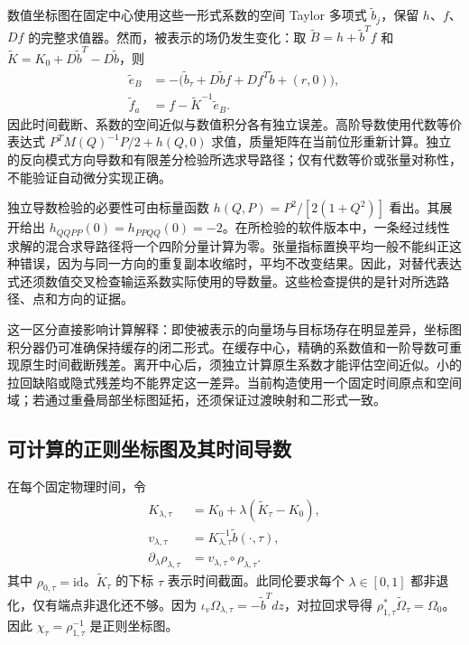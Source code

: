 数值坐标图在固定中心使用这些一形式系数的空间 Taylor 多项式 $\widetilde b_j$，保留 $h$、$f$、$Df$ 的完整求值器。然而，被表示的场仍发生变化：取 $\widetilde B=h+\widetilde b^Tf$ 和 $\widetilde K=K_0+D\widetilde b^T-D\widetilde b$，则
\begin{equation}
 \begin{aligned}
 \widetilde e_B&=-\bigl(\widetilde b_\tau+D\widetilde b f
                         +Df^T\widetilde b+(r,0)\bigr),\\
 \widetilde f_a&=f-\widetilde K^{-1}\widetilde e_B .
\end{aligned}
 \label{eq:th-cache-residual}
\end{equation}
因此时间截断、系数的空间近似与数值积分各有独立误差。高阶导数使用代数等价表达式 $P^TM(Q)^{-1}P/2+h(Q,0)$ 求值，质量矩阵在当前位形重新计算。独立的反向模式方向导数和有限差分检验所选求导路径；仅有代数等价或张量对称性，不能验证自动微分实现正确。

独立导数检验的必要性可由标量函数 $h(Q,P)=P^2/[2(1+Q^2)]$ 看出。其展开给出 $h_{QQPP}(0)=h_{PPQQ}(0)=-2$。在所检验的软件版本中，一条经过线性求解的混合求导路径将一个四阶分量计算为零。张量指标置换平均一般不能纠正这种错误，因为与同一方向的重复副本收缩时，平均不改变结果。因此，对替代表达式还须数值交叉检查输运系数实际使用的导数量。这些检查提供的是针对所选路径、点和方向的证据。

这一区分直接影响计算解释：即使被表示的向量场与目标场存在明显差异，坐标图积分器仍可准确保持缓存的闭二形式。在缓存中心，精确的系数值和一阶导数可重现原生时间截断残差。离开中心后，须独立计算原生系数才能评估空间近似。小的拉回缺陷或隐式残差均不能界定这一差异。当前构造使用一个固定时间原点和空间域；若通过重叠局部坐标图延拓，还须保证过渡映射和二形式一致。

\subsection{可计算的正则坐标图及其时间导数}
在每个固定物理时间，令
\begin{equation}
 \begin{aligned}
 K_{\lambda,\tau}&=K_0+\lambda(\widetilde K_\tau-K_0),\\
 v_{\lambda,\tau}&=K_{\lambda,\tau}^{-1}\widetilde b(\cdot,\tau),\\
 \partial_\lambda\rho_{\lambda,\tau}
     &=v_{\lambda,\tau}\circ\rho_{\lambda,\tau}.
\end{aligned}
 \label{eq:th-moser}
\end{equation}
其中 $\rho_{0,\tau}=\mathrm{id}$。$\widetilde K_\tau$ 的下标 $\tau$ 表示时间截面。此同伦要求每个 $\lambda\in[0,1]$ 都非退化，仅有端点非退化还不够。因为 $\iota_v\Omega_{\lambda,\tau}=-\widetilde b^Tdz$，对拉回求导得 $\rho_{1,\tau}^*\widetilde\Omega_\tau=\Omega_0$。因此 $\chi_\tau=\rho_{1,\tau}^{-1}$ 是正则坐标图。

